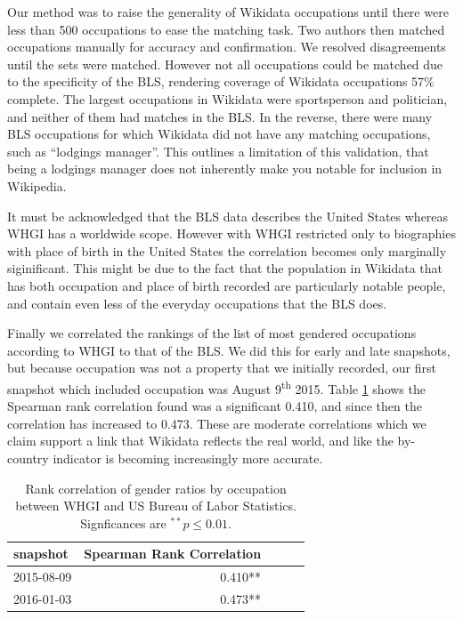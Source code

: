 \documentclass{sig-alternate-05-2015}
\begin{document}
Our method was to raise the generality of Wikidata occupations until there were less than 500 occupations to ease the matching task. Two authors then matched occupations manually for accuracy and confirmation. We resolved disagreements until the sets were matched. However not all occupations could be matched due to the specificity of the BLS, rendering coverage of Wikidata occupations 57\% complete. The largest occupations in Wikidata were sportsperson and politician, and neither of them had matches in the BLS. In the reverse, there were many BLS occupations for which Wikidata did not have any matching occupations, such as ``lodgings manager''. This outlines a limitation of this validation, that being a lodgings manager does not inherently make you notable for inclusion in Wikipedia. 

It must be acknowledged that the BLS data describes the United States whereas WHGI has a worldwide scope. However with WHGI restricted only to biographies with place of birth in the United States the correlation becomes only marginally siginificant. This might be due to the fact that the population in Wikidata that has both occupation and place of birth recorded are particularly notable people, and contain even less of the everyday occupations that the BLS does.

Finally we correlated the rankings of the list of most gendered occupations according to WHGI to that of the BLS. We did this for early and late snapshots, but because occupation was not a property that we initially recorded, our first snapshot which included occupation was August 9\textsuperscript{th} 2015.  Table \ref{table:bls} shows the Spearman rank correlation found was a significant 0.410, and since then the correlation has increased to 0.473. These are moderate correlations which we claim support a link that Wikidata reflects the real world, and like the by-country indicator is becoming increasingly more accurate.

\begin{table}
\caption{Rank correlation of gender ratios by occupation between WHGI and US
Bureau of Labor Statistics. Signficances are $ ^{**}p\leq 0.01$.}
\begin{tabular}{lrrrr}
\toprule
snapshot &  Spearman Rank Correlation \\
\midrule
2015-08-09 & 0.410**  \\
2016-01-03 & 0.473**  \\
\bottomrule
\end{tabular}
\label{table:bls}
\end{table}
\end{document}
